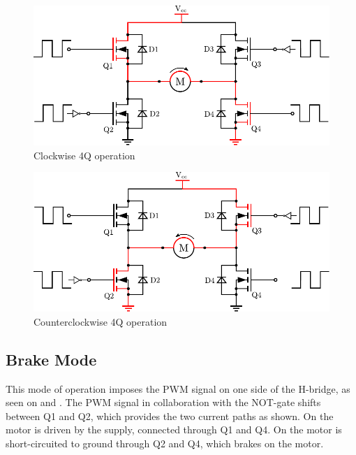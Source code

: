   \begin{minipage}{\linewidth}
  	\centering
  	\begin{minipage}{0.45\linewidth}
  		\begin{figure}[H]
  			\centering
  			\includegraphics[scale=.53]{figures/HbridgeClockwise4Q.pdf}
  			\caption{Clockwise 4Q operation}
  			\label{HbridgeClokwise4Q}
  		\end{figure}
  	\end{minipage}
  	\hspace{0.03\linewidth}
  	\begin{minipage}{0.45\linewidth}
  		\begin{figure}[H]
  			\centering
  			\includegraphics[scale=.53]{figures/HbridgeCounterClockwise4Q.pdf}
  			\caption{Counterclockwise 4Q operation}
  			\label{HbridgeCounterClokwise4Q}
  		\end{figure}
  	\end{minipage}
  \end{minipage}


\subsection{Brake Mode}
This mode of operation imposes the PWM signal on one side of the H-bridge, as seen on  and . The PWM signal in collaboration with the NOT-gate shifts between Q1 and Q2, which provides the two current paths as shown. On  the motor is driven by the supply, connected through Q1 and Q4. On  the motor is short-circuited to ground through Q2 and Q4, which brakes on the motor.

